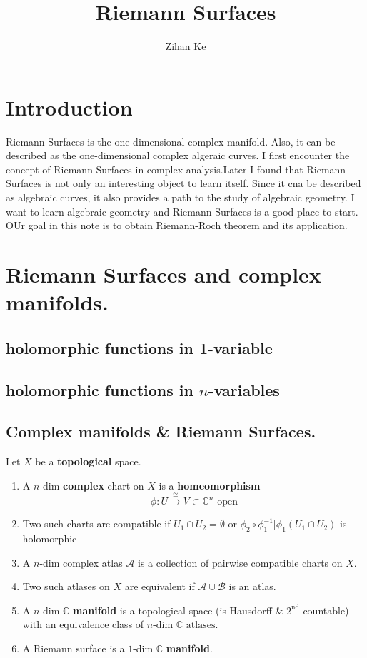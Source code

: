 \documentclass{article}
\title{Riemann Surfaces}
\author{Zihan Ke}
\begin{document}
\maketitle

\section*{Introduction}
Riemann Surfaces is the one-dimensional complex manifold. Also, it can be described as the one-dimensional complex algeraic curves. I first encounter the concept of Riemann Surfaces in complex analysis.Later I found that Riemann Surfaces is not only an interesting object to learn itself. Since it cna be described as algebraic curves, it also provides a path to the study of algebraic geometry. I want to learn algebraic geometry and Riemann Surfaces is a good place to start. 
OUr goal in this note is to obtain Riemann-Roch theorem and its application.
\newpage

\section{Riemann Surfaces and complex \textbf{manifolds}.}
\subsection{holomorphic functions in 1-variable}
\subsection{holomorphic functions in $n$-variables}
\subsection{Complex \textbf{manifolds} \& Riemann Surfaces.}

\begin{definition}
    Let $X$ be a \textbf{topological} space.
    \begin{enumerate}
        \item A $n$-dim \textbf{complex} chart on $X$ is a \textbf{homeomorphism}
        \[
        \phi : U \xrightarrow{\cong} V \subset \mathbb{C}^n \text{ open}
        \]
        \item Two such charts are compatible if
        $U_1 \cap U_2 = \emptyset$ or $\phi_2 \circ \phi_1^{-1} \big| \phi_1 (U_1 \cap U_2)$ is holomorphic
        \item A $n$-dim complex atlas $\mathcal{A}$ is a collection of pairwise compatible charts on $X$.
        \item Two such atlases on $X$ are equivalent if $\mathcal{A} \cup \mathcal{B}$ is an atlas.
        \item A $n$-dim $\mathbb{C}$ \textbf{manifold} is a topological space (is Hausdorff \& $2^{\text{nd}}$ countable) with an equivalence class of $n$-dim $\mathbb{C} \text{ atlases}$.
        \item A Riemann surface is a $1$-dim $\mathbb{C}$ \textbf{manifold}.
    \end{enumerate}
\end{definition}
\end{document}
